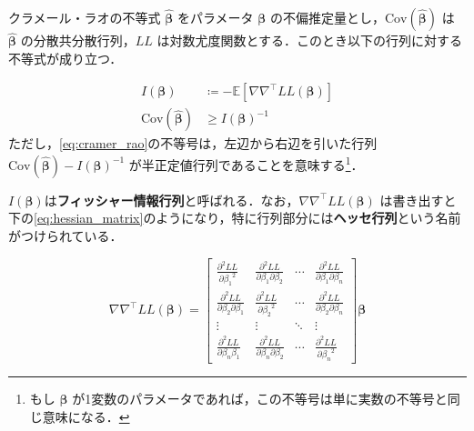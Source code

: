 \begin{itembox}[l]{クラメール・ラオの不等式}
    \label{it:cramer_rao}
    $\bm{\hat\beta}$ をパラメータ $\bm\beta$ の不偏推定量とし，$\mathrm{Cov}(\bm{\hat\beta})$ は $\bm{\hat\beta}$ の分散共分散行列，$LL$ は対数尤度関数とする．このとき以下の行列に対する不等式が成り立つ．

    \begin{align}
        \label{eq:fisher_information}
        I(\bm\beta) &\coloneqq -\mathbb{E}\left[\nabla\nabla^\top LL(\bm\beta)\right] \\
        \label{eq:cramer_rao}
        \mathrm{Cov}(\bm{\hat\beta}) &\ge I(\bm\beta)^{-1}
    \end{align}
    ただし，\eqref{eq:cramer_rao}の不等号は，左辺から右辺を引いた行列 $\mathrm{Cov}(\bm{\hat\beta})-I(\bm\beta)^{-1}$ が半正定値行列であることを意味する\footnote{もし $\bm\beta$ が1変数のパラメータであれば，この不等号は単に実数の不等号と同じ意味になる．}．
\end{itembox}

$I(\bm\beta)$は\textbf{フィッシャー情報行列}と呼ばれる．なお，$\nabla\nabla^\top LL(\bm\beta)$ は書き出すと下の\eqref{eq:hessian_matrix}のようになり，特に行列部分には\textbf{ヘッセ行列}という名前がつけられている．

\begin{equation}
    \label{eq:hessian_matrix}
    \nabla\nabla^\top LL(\bm\beta) = \begin{bmatrix}
        \frac{\partial^2 LL}{\partial {\beta_1}^2}              & \frac{\partial^2 LL}{\partial \beta_1 \partial \beta_2} & \cdots & \frac{\partial^2 LL}{\partial \beta_1 \partial \beta_n}  \\
        \frac{\partial^2 LL}{\partial \beta_2 \partial \beta_1} & \frac{\partial^2 LL}{\partial {\beta_2}^2}              & \cdots & \frac{\partial^2 LL}{\partial \beta_2 \partial \beta_n } \\
        \vdots                                                  & \vdots                                                  & \ddots & \vdots                                                   \\
        \frac{\partial^2 LL}{\partial \beta_n \beta_1}          & \frac{\partial^2 LL}{\partial \beta_n \partial \beta_2} & \cdots & \frac{\partial^2 LL}{\partial {\beta_n}^2}
    \end{bmatrix} \bm\beta
\end{equation}

